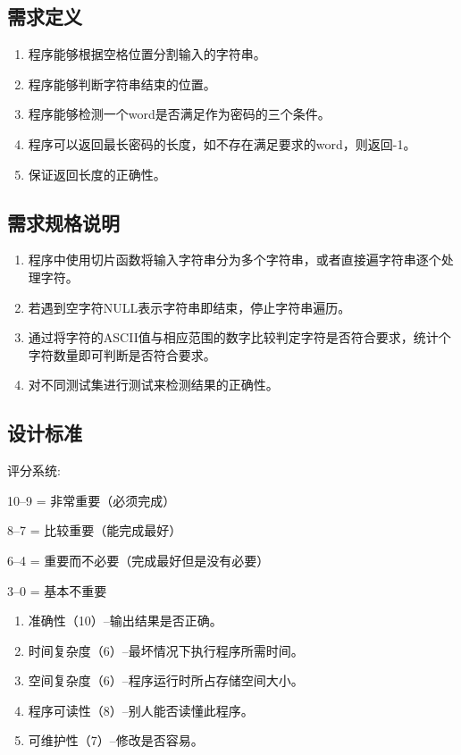 \begin{spacing}{1.5}
    \subsection{需求定义}
    \begin{enumerate} [\indent 1、]
        \item 程序能够根据空格位置分割输入的字符串。
        \item 程序能够判断字符串结束的位置。
        \item 程序能够检测一个word是否满足作为密码的三个条件。
        \item 程序可以返回最长密码的长度，如不存在满足要求的word，则返回-1。
        \item 保证返回长度的正确性。
    \end{enumerate}

    \subsection{需求规格说明}
    \begin{enumerate} [\indent 1、]
        \item 程序中使用切片函数将输入字符串分为多个字符串，或者直接遍字符串逐个处理字符。
        \item 若遇到空字符NULL表示字符串即结束，停止字符串遍历。
        \item 通过将字符的ASCII值与相应范围的数字比较判定字符是否符合要求，统计个字符数量即可判断是否符合要求。
        \item 对不同测试集进行测试来检测结果的正确性。
    \end{enumerate}
    
    \subsection{设计标准}
    评分系统:

    10--9 = 非常重要（必须完成）
    
    8--7 = 比较重要（能完成最好）
    
    6--4 = 重要而不必要（完成最好但是没有必要）
    
    3--0 = 基本不重要

    \begin{enumerate} [\indent 1、]
        \item 准确性（10）--输出结果是否正确。
        \item 时间复杂度（6）--最坏情况下执行程序所需时间。
        \item 空间复杂度（6）--程序运行时所占存储空间大小。
        \item 程序可读性（8）--别人能否读懂此程序。
        \item 可维护性（7）--修改是否容易。
    \end{enumerate}


\end{spacing}
